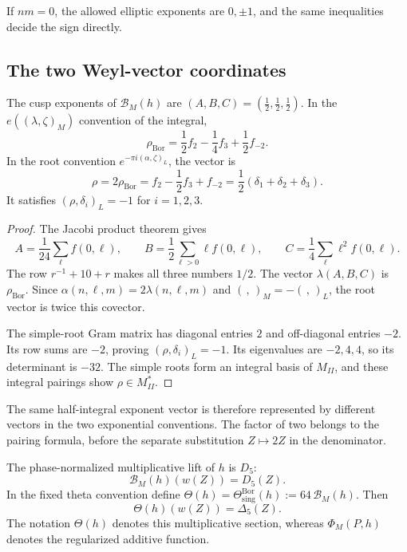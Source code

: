 If \(nm=0\), the allowed elliptic exponents are \(0,\pm1\),
and the same inequalities decide the sign directly.

\subsection{The two Weyl-vector coordinates}
\label{ssec:weyl-vector-rho}

\begin{theorem}
\label{thm:weyl-vector-lift}
The cusp exponents of \(\mathcal B_M(h)\) are
\((A,B,C)=(\tfrac12,\tfrac12,\tfrac12)\).
In the \(e((\lambda,\zeta)_M)\) convention of the integral,
\[
 \rho_{\mathrm{Bor}}
 =\frac12f_2-\frac14f_3+\frac12f_{-2}.
\]
In the root convention
\(e^{-\pi i(\alpha,\zeta)_L}\), the vector is
\[
 \rho=2\rho_{\mathrm{Bor}}
 =f_2-\frac12f_3+f_{-2}
 =\frac12(\delta_1+\delta_2+\delta_3).
\]
It satisfies \((\rho,\delta_i)_L=-1\) for \(i=1,2,3\).
\end{theorem}

\begin{proof}
The Jacobi product theorem \cite[Theorem 2.1]{GNII} gives
\[
 A=\frac1{24}\sum_\ell f(0,\ell),\qquad
 B=\frac12\sum_{\ell>0}\ell f(0,\ell),\qquad
 C=\frac14\sum_\ell\ell^2 f(0,\ell).
\]
The row \(r^{-1}+10+r\) makes all three numbers \(1/2\).
The vector \(\lambda(A,B,C)\) is \(\rho_{\mathrm{Bor}}\).
Since \(\alpha(n,\ell,m)=2\lambda(n,\ell,m)\) and
\((\, ,\,)_M=-(\, ,\,)_L\), the root vector is twice this
covector.

The simple-root Gram matrix has diagonal entries \(2\) and
off-diagonal entries \(-2\).  Its row sums are \(-2\), proving
\((\rho,\delta_i)_L=-1\).
Its eigenvalues are \(-2,4,4\), so its determinant is \(-32\).
The simple roots form an integral basis of \(M_{II}\), and these
integral pairings show \(\rho\in M_{II}^*\).
\end{proof}

The same half-integral exponent vector is therefore represented by
different vectors in the two exponential conventions.
The factor of two belongs to the pairing formula, before the
separate substitution \(Z\mapsto2Z\) in the denominator.

\begin{theorem}
\label{thm:delta5-as-theta-lift}
The phase-normalized multiplicative lift of \(h\) is \(D_5\):
\[
 \mathcal B_M(h)(w(Z))=D_5(Z).
\]
In the fixed theta convention define
\(\Theta(h)=\Theta_{\mathrm{sing}}^{\mathrm{Bor}}(h)
:=64\,\mathcal B_M(h)\).
Then
\[
 \Theta(h)(w(Z))=\Delta_5(Z).
\]
The notation \(\Theta(h)\) denotes this multiplicative section,
whereas \(\Phi_M(P,h)\) denotes the regularized additive function.
\end{theorem}

